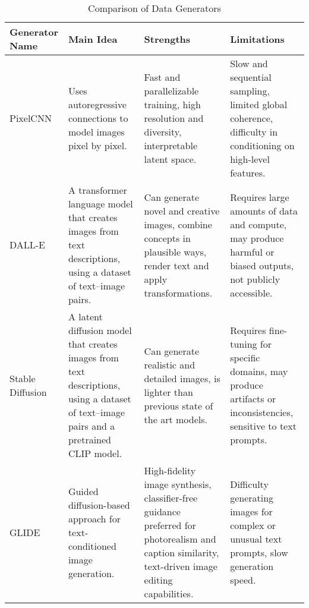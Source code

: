 \begin{table}[ht]
\centering
\caption{Comparison of Data Generators}
\begin{tabularx}{\textwidth}{|X|X|X|X|}
\hline
\textbf{Generator Name} & \textbf{Main Idea}                                                                                                                    & \textbf{Strengths}                                                                                                                                 & \textbf{Limitations}                                                                                                          \\ \hline
PixelCNN~\cite{oord_conditional_2016}                & Uses autoregressive connections to model images pixel by pixel.                                                                       & Fast and parallelizable training, high resolution and diversity, interpretable latent space.                                                       & Slow and sequential sampling, limited global coherence, difficulty in conditioning on high-level features.                    \\ \hline
DALL-E~\cite{ramesh_zero-shot_2021}                  & A transformer language model that creates images from text descriptions, using a dataset of text–image pairs.                         & Can generate novel and creative images, combine concepts in plausible ways, render text and apply transformations.                                 & Requires large amounts of data and compute, may produce harmful or biased outputs, not publicly accessible.                   \\ \hline
Stable Diffusion~\cite{rombach_high-resolution_2021}        & A latent diffusion model that creates images from text descriptions, using a dataset of text–image pairs and a pretrained CLIP model. & Can generate realistic and detailed images, is lighter than previous state of the art models.                                                      & Requires fine-tuning for specific domains, may produce artifacts or inconsistencies, sensitive to text prompts.               \\ \hline
GLIDE~\cite{nichol_glide_2021}                   & Guided diffusion-based approach for text-conditioned image generation.                                                                & High-fidelity image synthesis, classifier-free guidance preferred for photorealism and caption similarity, text-driven image editing capabilities. & Difficulty generating images for complex or unusual text prompts, slow generation speed.                                      \\ \hline

\end{tabularx}
\end{table}
